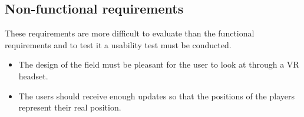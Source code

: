 \subsection{Non-functional requirements}
These requirements are more difficult to evaluate than the functional requirements and to test it a usability test must be conducted.
\begin{itemize}
    \item The design of the field must be pleasant for the user to look at through a VR headset.
    \item The users should receive enough updates so that the positions of the players represent their real position.
\end{itemize}
